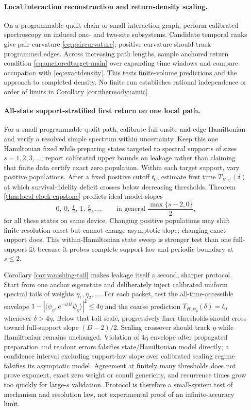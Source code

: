 \paragraph{Local interaction reconstruction and return-density scaling.}
On a programmable qudit chain or small interaction graph, perform calibrated
spectroscopy on induced one- and two-site subsystems.  Candidate temporal
ranks give pair curvature \eqref{eq:paircurvature}; positive curvature should
track programmed edges.  Across increasing path lengths, sample anchored
return condition \eqref{eq:anchoredtarget-main} over expanding time windows
and compare occupation with \eqref{eq:exactdensity}.  This tests finite-volume
predictions and the approach to completed density.  No finite run establishes
rational independence or order of limits in Corollary
\ref{cor:thermodynamic}.

\paragraph{All-state support-stratified first return on one local path.}
For a small programmable qudit path, calibrate full onsite and edge
Hamiltonian and verify a resolved simple spectrum within uncertainty.  Keep
this one Hamiltonian fixed while preparing states targeted to spectral
supports of sizes $s=1,2,3,\ldots$; report calibrated upper bounds on leakage
rather than claiming that finite data certify exact zero population.  Within
each target support, vary positive populations.  After a fixed positive
cutoff $t_0$, estimate first time $T_{H,\psi}(\delta)$ at which
survival-fidelity deficit crosses below decreasing thresholds.  Theorem
\ref{thm:local-clock-capstone} predicts ideal-model slopes
\[
  0,\ 0,\ \tfrac12,\ 1,\ \tfrac32,\ldots,
  \qquad\text{in general }\frac{\max\{s-2,0\}}2,
\]
for all these states on same device.  Changing positive populations may shift
finite-resolution onset but cannot change asymptotic slope; changing exact
support does.  This within-Hamiltonian state sweep is stronger test than one
full-support fit because it probes complete support law and periodic boundary
at $s\le2$.

Corollary \ref{cor:vanishing-tail} makes leakage itself a second, sharper
protocol.  Start from one anchor eigenstate and deliberately inject calibrated
uniform spectral tails of weights $\eta_1,\eta_2,\ldots$.  For each packet,
test the all-time-accessible envelope
$1-|\langle\psi_\eta,e^{-itH}\psi_\eta\rangle|^2\le4\eta$ and the coarse
prediction $T_{H,\psi_\eta}(\delta)=t_0$ whenever $\delta>4\eta$.  Below that
tail scale, progressively finer thresholds should cross toward full-support
slope $(D-2)/2$.  Scaling crossover should track $\eta$ while Hamiltonian
remains unchanged.  Violation of $4\eta$ envelope after propagated
preparation and readout errors falsifies state/Hamiltonian model directly; a
confidence interval excluding support-law slope over calibrated scaling
regime falsifies its asymptotic model.  Agreement at finitely many thresholds
does not prove exponent, exact zero weight or conull genericity, and recurrence
times grow too quickly for large-$s$ validation.  Protocol is therefore a
small-system test of mechanism and resolution law, not experimental proof of
an infinite-accuracy limit.

